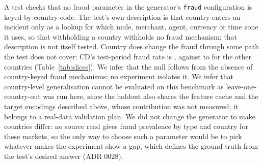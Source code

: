 \begin{table}[htbp]
\centering
\caption{AUC per country, in-sample and with the country held out of model fitting (diagnostic model,
draw \texttt{d8083dbc}, \nBatTestRows{} test rows, evidence commit \texttt{d40fca2}, source
\texttt{docs/benchmarks/m4\_battery\_d8083dbc\_e1.txt}), each with an account-clustered interval over
that country's test rows from a reproduction of the same fits
(\texttt{evidence/\allowbreak round2\_\allowbreak gate\_\allowbreak d8083dbc.txt}). The evidence file marks CD, which rests on
fewer than \nSmallCountThreshold{} fraud rows, as direction rather than measurement. Test accounts:
all of the country's accounts in the test period, the unit the clustered bootstrap resamples.}
\label{tab:loco}
\end{table}

A test checks that no fraud parameter in the generator's \texttt{fraud} configuration is keyed by
country code. The test's own description is that country enters an incident only as a lookup for
which mule, merchant, agent, currency or time zone it uses, so that withholding a country withholds
no fraud mechanism; that description is not itself tested. Country does change the fraud through
some path the test does not cover: CD's test-period fraud rate is \nCoFraudRateCD{}, against
\nCoFraudRateMin{} to \nCoFraudRateMax{} for the other countries (Table~\ref{tab:slices}). We infer
that the null follows from the absence of country-keyed fraud mechanisms; no experiment isolates it.
We infer that country-level generalisation cannot be evaluated on this benchmark as
leave-one-country-out was run here, since the holdout also shares the feature cache and the target
encodings described above, whose contribution was not measured; it belongs to a real-data
validation plan. We did not change the generator to make countries differ: no source read gives
fraud prevalence by type and country for these markets, so the only way to choose such a parameter
would be to pick whatever makes the experiment show a gap, which defines the ground truth from the
test's desired answer (ADR 0028).

